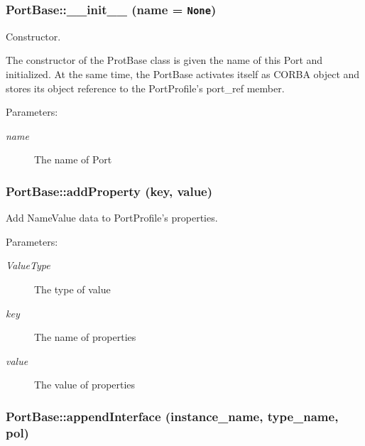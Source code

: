 \subsubsection{\setlength{\rightskip}{0pt plus 5cm}Port\-Base::\_\-\_\-init\_\-\_\- (name = {\tt None})}\label{classPortBase_PortBasea0}


Constructor. 

The constructor of the Prot\-Base class is given the name of this Port and initialized. At the same time, the Port\-Base activates itself as CORBA object and stores its object reference to the Port\-Profile's port\_\-ref member.

\begin{Desc}
\item[Parameters:]
\begin{description}
\item[{\em name}]The name of Port\end{description}
\end{Desc}
\subsubsection{\setlength{\rightskip}{0pt plus 5cm}Port\-Base::add\-Property (key, value)}\label{classPortBase_PortBasea27}


Add Name\-Value data to Port\-Profile's properties. 

\begin{Desc}
\item[Parameters:]
\begin{description}
\item[{\em Value\-Type}]The type of value \item[{\em key}]The name of properties \item[{\em value}]The value of properties\end{description}
\end{Desc}
\subsubsection{\setlength{\rightskip}{0pt plus 5cm}Port\-Base::append\-Interface (instance\_\-name, type\_\-name, pol)}\label{classPortBase_PortBasea25}


